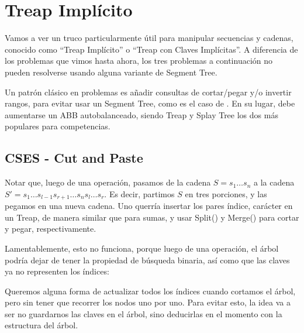 \section{Treap Implícito}

Vamos a ver un truco particularmente útil para manipular secuencias y cadenas,
conocido como ``Treap Implícito'' o ``Treap con Claves Implícitas''. 
A diferencia de los problemas que vimos hasta ahora, los tres problemas a continuación no
pueden resolverse usando alguna variante de Segment Tree.

Un patrón clásico en problemas es añadir consultas de cortar/pegar y/o invertir rangos,
para evitar usar un Segment Tree, como es el caso de .
En su lugar, debe aumentarse un ABB autobalanceado, siendo Treap y Splay Tree
los dos más populares para competencias.

\subsection{CSES - Cut and Paste}


Notar que, luego de una operación, pasamos de la cadena \(S = s_1 \dots s_n\) a la cadena \(S' = s_1 \dots s_{l - 1} s_{r + 1} \dots s_n s_l \dots s_r\).
Es decir, partimos \(S\) en tres porciones, y las pegamos en una nueva cadena. 
Uno querría insertar los pares índice, carácter en un Treap, de manera similar que para sumas, 
y usar Split() y Merge() para cortar y pegar, respectivamente.

Lamentablemente, esto no funciona, porque luego de una operación, el árbol podría dejar de tener la propiedad de búsqueda binaria, así como que las claves ya no representen los índices:



Queremos alguna forma de actualizar todos los índices cuando cortamos el árbol,
pero sin tener que recorrer los nodos uno por uno.
Para evitar esto, la idea va a ser no guardarnos las claves en el árbol,
sino deducirlas en el momento con la estructura del árbol.

